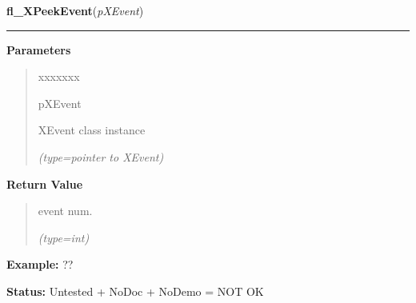 \hspace{.8\funcindent}\begin{boxedminipage}{\funcwidth}

    \raggedright \textbf{fl\_XPeekEvent}(\textit{pXEvent})

    \vspace{-1.5ex}

    \rule{\textwidth}{0.5\fboxrule}
\setlength{\parskip}{2ex}
\setlength{\parskip}{1ex}
      \textbf{Parameters}
      \vspace{-1ex}

      \begin{quote}
        \begin{Ventry}{xxxxxxx}

          \item[pXEvent]

          XEvent class instance

            {\it (type=pointer to XEvent)}

        \end{Ventry}

      \end{quote}

      \textbf{Return Value}
    \vspace{-1ex}

      \begin{quote}
      event num.

      {\it (type=int)}

      \end{quote}

\textbf{Example:} ??



\textbf{Status:} Untested + NoDoc + NoDemo = NOT OK



    \end{boxedminipage}

    \label{xformslib:flxbasic:fl_XEventsQueued}

    \vspace{0.5ex}

